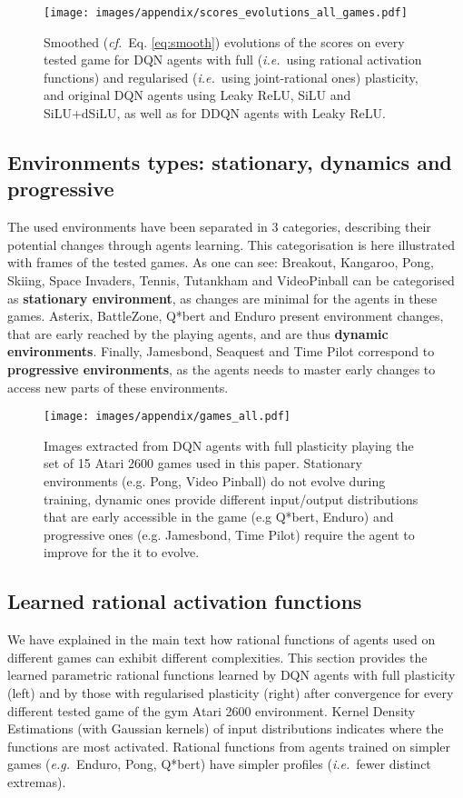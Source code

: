 \documentclass[accepted]{article}
\theoremstyle{plain}
\theoremstyle{definition}
\theoremstyle{remark}
\newcommand{\eg}{\emph{e.g.}~}
\newcommand{\ie}{\emph{i.e.}~}
\newcommand{\cf}{\emph{cf.}~}
\begin{document}
\begin{figure}[H]
\centering
\texttt{[image: images/appendix/scores\_evolutions\_all\_games.pdf]} 
\caption{Smoothed (\cf Eq. \ref{eq:smooth}) evolutions of the scores on every tested game for DQN agents with full (\ie using rational activation functions) and regularised (\ie using joint-rational ones) plasticity, and original DQN agents using Leaky ReLU, SiLU and SiLU+dSiLU, as well as for DDQN agents with Leaky ReLU.}
\end{figure}

\subsection{Environments types: stationary, dynamics and progressive}
\label{app:env_classification}
The used environments have been separated in 3 categories, describing their potential changes through agents learning. This categorisation is here illustrated with frames of the tested games. As one can see: Breakout, Kangaroo, Pong, Skiing, Space Invaders, Tennis, Tutankham and VideoPinball can be categorised as \textbf{stationary environment}, as changes are minimal for the agents in these games. Asterix, BattleZone, Q*bert and Enduro present environment changes, that are early reached by the playing agents, and are thus \textbf{dynamic environments}. Finally, Jamesbond, Seaquest and Time Pilot correspond to \textbf{progressive environments}, as the agents needs to master early changes to access new parts of these environments.

\begin{figure}[H]
\centering
\texttt{[image: images/appendix/games\_all.pdf]} \caption{Images extracted from DQN agents with full plasticity playing the set of 15 Atari 2600 games used in this paper. Stationary environments (e.g. Pong, Video Pinball) do not evolve during training, dynamic ones provide different input/output distributions that are early accessible in the game (e.g Q*bert, Enduro) and progressive ones (e.g. Jamesbond, Time Pilot) require the agent to improve for the it to evolve.}
\label{fig:score_evo_complete}
\end{figure}

\subsection{Learned rational activation functions}
\label{app:learned_afs}
We have explained in the main text how rational functions of agents used on different games can exhibit different complexities. This section provides the learned parametric rational functions learned by DQN agents with full plasticity (left) and by those with regularised plasticity (right) after convergence for every different tested game of the gym Atari 2600 environment.
Kernel Density Estimations (with Gaussian kernels) of input distributions indicates where the functions are most activated. Rational functions from agents trained on simpler games (\eg Enduro, Pong, Q*bert) have simpler profiles (\ie fewer distinct extremas).
\end{document}
